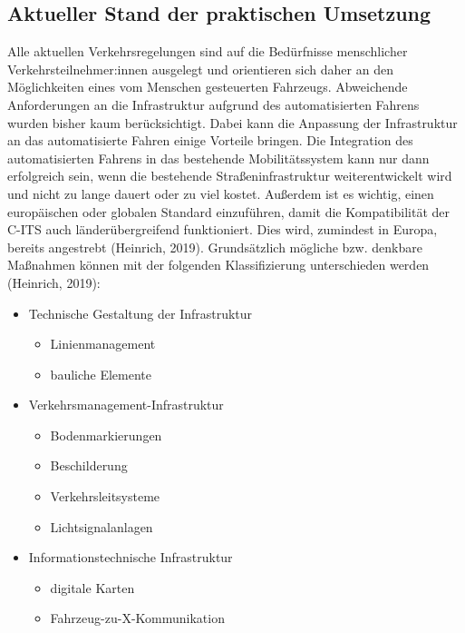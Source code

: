 \documentclass[
]{book}
\providecommand{\tightlist}{%
  \setlength{\itemsep}{0pt}\setlength{\parskip}{0pt}}
\begin{document}
\hypertarget{aktueller-stand-der-praktischen-umsetzung-19}{%
\subsection*{Aktueller Stand der praktischen Umsetzung}\label{aktueller-stand-der-praktischen-umsetzung-19}}

Alle aktuellen Verkehrsregelungen sind auf die Bedürfnisse menschlicher Verkehrsteilnehmer:innen ausgelegt und orientieren sich daher an den Möglichkeiten eines vom Menschen gesteuerten Fahrzeugs. Abweichende Anforderungen an die Infrastruktur aufgrund des automatisierten Fahrens wurden bisher kaum berücksichtigt. Dabei kann die Anpassung der Infrastruktur an das automatisierte Fahren einige Vorteile bringen. Die Integration des automatisierten Fahrens in das bestehende Mobilitätssystem kann nur dann erfolgreich sein, wenn die bestehende Straßeninfrastruktur weiterentwickelt wird und nicht zu lange dauert oder zu viel kostet. Außerdem ist es wichtig, einen europäischen oder globalen Standard einzuführen, damit die Kompatibilität der C-ITS auch länderübergreifend funktioniert. Dies wird, zumindest in Europa, bereits angestrebt (Heinrich, 2019). Grundsätzlich mögliche bzw. denkbare Maßnahmen können mit der folgenden Klassifizierung unterschieden werden (Heinrich, 2019):

\begin{itemize}
\tightlist
\item
  Technische Gestaltung der Infrastruktur

  \begin{itemize}
  \tightlist
  \item
    Linienmanagement
  \item
    bauliche Elemente
  \end{itemize}
\item
  Verkehrsmanagement-Infrastruktur

  \begin{itemize}
  \tightlist
  \item
    Bodenmarkierungen
  \item
    Beschilderung
  \item
    Verkehrsleitsysteme
  \item
    Lichtsignalanlagen
  \end{itemize}
\item
  Informationstechnische Infrastruktur

  \begin{itemize}
  \tightlist
  \item
    digitale Karten
  \item
    Fahrzeug-zu-X-Kommunikation
  \end{itemize}
\end{itemize}
\end{document}

